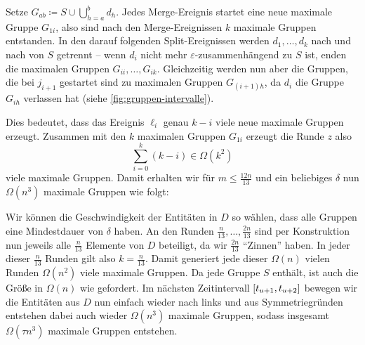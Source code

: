 \begin{beweis}
	Setze $G_{ab} \coloneqq S \cup \bigcup_{h=a}^b d_h$.
	Jedes Merge-Ereignis startet eine neue maximale Gruppe $G_{1i}$, also sind nach den Merge-Ereignissen $k$ maximale Gruppen entstanden.
	In den darauf folgenden Split-Ereignissen werden $d_1, \ldots , d_k$ nach und nach von $S$ getrennt -- wenn $d_i$ nicht mehr $\varepsilon$-zusammenhängend zu $S$ ist, enden die maximalen Gruppen $G_{ii}, \ldots , G_{ik}$.
	Gleichzeitig werden nun aber die Gruppen, die bei $j_{i+1}$ gestartet sind zu maximalen Gruppen $G_{(i+1)h}$, da $d_i$ die Gruppe $G_{ih}$ verlassen hat (siehe \cref{fig:gruppen-intervalle}).
	
	Dies bedeutet, dass das Ereignis $\ell_i$ genau $k-i$ viele neue maximale Gruppen erzeugt.
	Zusammen mit den $k$ maximalen Gruppen $G_{1i}$ erzeugt die Runde $z$ also
	\[
		\sum_{i=0}^{k} (k-i)  \in \Omega(k^2)
	\]
	viele maximale Gruppen.
	Damit erhalten wir für $m \le \frac{12n}{13}$ und ein beliebiges $\delta$ nun $\Omega(n^3)$ maximale Gruppen wie folgt:
	
	Wir können die Geschwindigkeit der Entitäten in $D$ so wählen, dass alle Gruppen eine Mindestdauer von $\delta$ haben.
	An den Runden $\frac{n}{13}, \ldots , \frac{2n}{13}$ sind per Konstruktion nun jeweils alle $\frac{n}{13}$ Elemente von $D$ beteiligt, da wir $\frac{2n}{13}$ \enquote{Zinnen} haben.
	In jeder dieser $\frac{n}{13}$ Runden gilt also $k=\frac{n}{13}$.
	Damit generiert jede dieser $\Omega(n)$ vielen Runden $\Omega(n^2)$ viele maximale Gruppen.
	Da jede Gruppe $S$ enthält, ist auch die Größe in $\Omega(n)$ wie gefordert.
	Im nächsten Zeitintervall $\benbrace*{t_{u+1}, t_{u+2}}$ bewegen wir die Entitäten aus $D$ nun einfach wieder nach links und aus Symmetriegründen entstehen dabei auch wieder $\Omega(n^3)$ maximale Gruppen, sodass insgesamt $\Omega(\tau n^3)$ maximale Gruppen entstehen.
\end{beweis}

